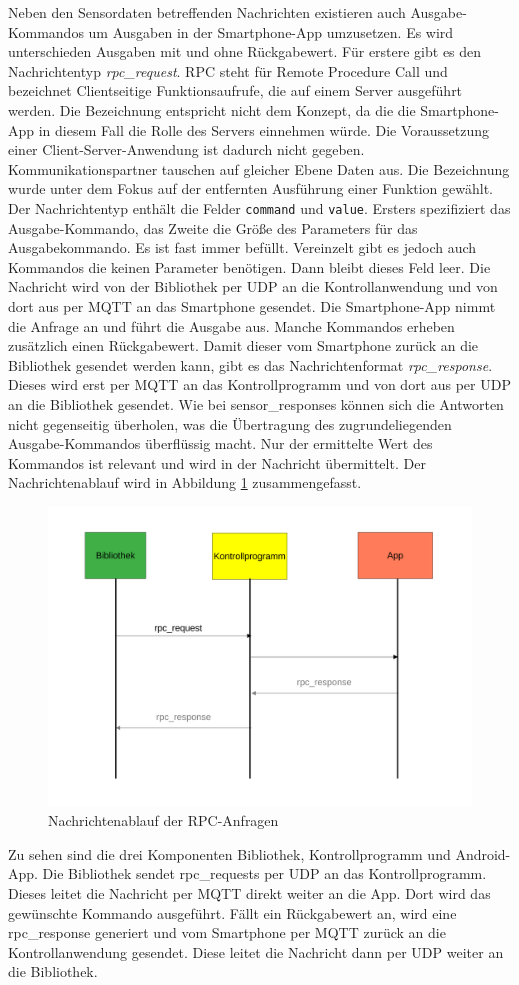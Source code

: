 \documentclass[11pt,a4paper]{report}
\begin{document}
Neben den Sensordaten betreffenden Nachrichten existieren auch Ausgabe-Kommandos um Ausgaben in der Smartphone-App umzusetzen.
Es wird unterschieden Ausgaben mit und ohne Rückgabewert.
Für erstere gibt es den Nachrichtentyp \textit{rpc\_request}.
RPC steht für Remote Procedure Call und bezeichnet Clientseitige Funktionsaufrufe, die auf einem Server ausgeführt werden.
Die Bezeichnung entspricht nicht dem Konzept, da die die Smartphone-App in diesem Fall die Rolle des Servers einnehmen würde.
Die Voraussetzung einer Client-Server-Anwendung ist dadurch nicht gegeben.
Kommunikationspartner tauschen auf gleicher Ebene Daten aus.
Die Bezeichnung wurde unter dem Fokus auf der entfernten Ausführung einer Funktion gewählt.
Der Nachrichtentyp enthält die Felder \texttt{command} und \texttt{value}.
Ersters spezifiziert das Ausgabe-Kommando, das Zweite die Größe des Parameters für das Ausgabekommando.
Es ist fast immer befüllt.
Vereinzelt gibt es jedoch auch Kommandos die keinen Parameter benötigen.
Dann bleibt dieses Feld leer.
Die Nachricht wird von der Bibliothek per UDP an die Kontrollanwendung und von dort aus per MQTT an das Smartphone gesendet.
Die Smartphone-App nimmt die Anfrage an und führt die Ausgabe aus.
Manche Kommandos erheben zusätzlich einen Rückgabewert.
Damit dieser vom Smartphone zurück an die Bibliothek gesendet werden kann, gibt es das Nachrichtenformat \textit{rpc\_response}.
Dieses wird erst per MQTT an das Kontrollprogramm und von dort aus per UDP an die Bibliothek gesendet.
Wie bei sensor\_responses können sich die Antworten nicht gegenseitig überholen, was die Übertragung des zugrundeliegenden Ausgabe-Kommandos überflüssig macht.
Nur der ermittelte Wert des Kommandos ist relevant und wird in der Nachricht übermittelt.
Der Nachrichtenablauf wird in Abbildung \ref{fig:message_flow_rpc} zusammengefasst.
\begin{figure}[htbp]
\centering
\includegraphics[width=.8\textwidth]{images/message_flow_rpc.pdf}
\caption{Nachrichtenablauf der RPC-Anfragen}
\label{fig:message_flow_rpc}
\end{figure}
Zu sehen sind die drei Komponenten Bibliothek, Kontrollprogramm und Android-App.
Die Bibliothek sendet rpc\_requests per UDP an das Kontrollprogramm.
Dieses leitet die Nachricht per MQTT direkt weiter an die App.
Dort wird das gewünschte Kommando ausgeführt.
Fällt ein Rückgabewert an, wird eine rpc\_response generiert und vom Smartphone per MQTT zurück an die Kontrollanwendung gesendet.
Diese leitet die Nachricht dann per UDP weiter an die Bibliothek.
\end{document}
